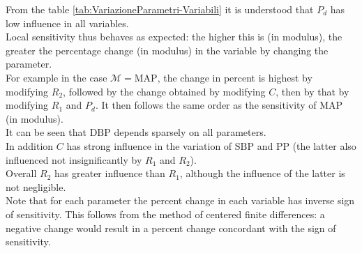 \newpage
From the table \ref{tab:VariazioneParametri-Variabili} it is understood that $P_d$ has low influence in all variables.\\
Local sensitivity thus behaves as expected: the higher this is (in modulus), the greater the percentage change (in modulus) in the variable by changing the parameter.\\
For example in the case $\mathcal{M}=\text{MAP}$, the change in percent is highest by modifying $R_2$, followed by the change obtained by modifying $C$, then by that by modifying $R_1$ and $P_d$. It then follows the same order as the sensitivity of $\text{MAP}$ (in modulus).\\
It can be seen that $\text{DBP}$ depends sparsely on all parameters.\\
In addition $C$ has strong influence in the variation of $\text{SBP}$ and $\text{PP}$ (the latter also influenced not insignificantly by $R_1$ and $R_2$).\\
Overall $R_2$ has greater influence than $R_1$, although the influence of the latter is not negligible.\\

Note that for each parameter the percent change in each variable has inverse sign of sensitivity. This follows from the method of centered finite differences: a negative change would result in a percent change concordant with the sign of sensitivity.